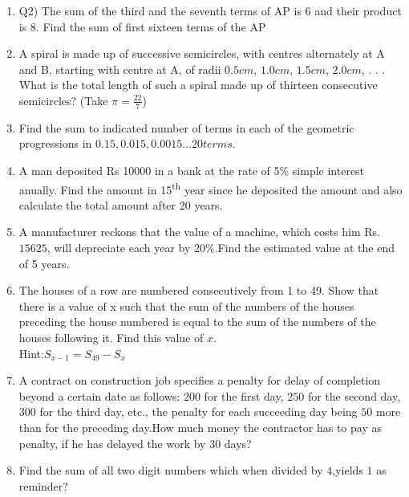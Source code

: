\begin{enumerate}[label=\thechapter.\arabic*,ref=\thechapter.\theenumi]
\item Q2) The sum of the third and the seventh terms of AP is 6 and their product is 8. Find the sum of first sixteen terms of the AP \\
\solution 
\pagebreak
\item A spiral is made up of successive semicircles, with centres alternately at A and B, starting with centre at A, of radii $0.5 cm$, $1.0 cm$, $1.5 cm$, $2.0 cm$, . . . What is the total length of such a spiral made up of thirteen consecutive semicircles? (Take $\pi = \frac{22}{7}$)\\
\solution

\newpage

\item Find the sum to indicated number of terms in each of the geometric progressions in
$0.15, 0.015, 0.0015\ldots 20 terms$.\\
\solution

\pagebreak

\item A man deposited Rs 10000 in a bank at the rate of 5\% simple interest anually. Find the amount in 15\textsuperscript{th} year since he deposited the amount and also calculate the total amount after 20 years.\\
\solution

\pagebreak
\item A manufacturer reckons that the value of a machine, which costs him Rs.$15625$, will depreciate each year by $20\%$.Find the estimated value at the end of 5 years.\\
\solution

\pagebreak


\item The houses of a row are numbered consecutively from 1 to 49. Show that there is a value
of x such that the sum of the numbers of the houses preceding the house numbered is equal to the sum of the numbers of the houses following it. Find this value of $x$.\\
Hint:$ S_{x-1}=S_{49}-S_x$\\
\solution

\pagebreak

\item A contract on construction job specifies a penalty for delay of completion beyond a certain date as follows: \rupee $200$ for the first day, \rupee $250$ for the second day, \rupee $300$ for the third day, etc., the penalty for each succeeding day being \rupee $50$ more than for the preceding day.How much money the contractor has to pay as penalty, if he has delayed the work by $30$ days?\\
\solution

\item Find the sum of all two digit numbers which when divided by $4$,yields $1$ as reminder?\\
\solution

\pagebreak


\end{enumerate}
